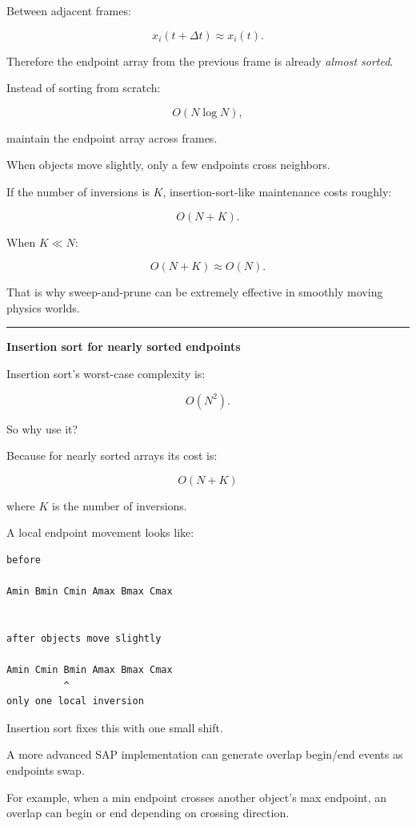 Between adjacent frames:

\[
x_i(t+\Delta t)
\approx
x_i(t).
\]

Therefore the endpoint array from the previous frame is already \emph{almost sorted}.

Instead of sorting from scratch:

\[
O(N\log N),
\]

maintain the endpoint array across frames.

When objects move slightly, only a few endpoints cross neighbors.

If the number of inversions is \(K\), insertion-sort-like maintenance costs roughly:

\[
O(N+K).
\]

When \(K\ll N\):

\[
O(N+K)\approx O(N).
\]

That is why sweep-and-prune can be extremely effective in smoothly moving physics worlds.

\begin{center}\rule{0.5\linewidth}{0.5pt}\end{center}

\textbf{Insertion sort for nearly sorted endpoints}

Insertion sort's worst-case complexity is:

\[
O(N^2).
\]

So why use it?

Because for nearly sorted arrays its cost is:

\[
O(N+K)
\]

where \(K\) is the number of inversions.

A local endpoint movement looks like:

\begin{verbatim}
before

Amin Bmin Cmin Amax Bmax Cmax


after objects move slightly

Amin Cmin Bmin Amax Bmax Cmax
          ^
only one local inversion
\end{verbatim}

Insertion sort fixes this with one small shift.

A more advanced SAP implementation can generate overlap begin/end events as endpoints swap.

For example, when a min endpoint crosses another object's max endpoint, an overlap can begin or end depending on crossing direction.

